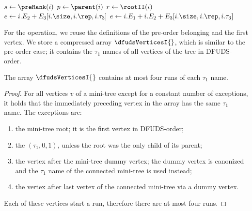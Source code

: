 \begin{algorithm}
\begin{algorithmic}
		\State {}
		\State {}
	\Else
		\State $s \gets \preRank(i)$
			\State $p \gets \parent(i)$
				\State $r \gets \rootII(i)$
				 
					\State $e \gets i.E_2 + E_3[i.\size, i.\rep, i.\tau_3]$
					\State {}
				\Else {}
					\State $e \gets i.E_1 + i.E_2 + E_3[i.\size, i.\rep, i.\tau_3]$
					\State {}
				\EndIf
			 
				\State {}
			\Else {}
				\State {}
			\EndIf
		 
			\State {}
		\Else {}
			\State {}
		\EndIf
	\EndIf
\EndFunction
\end{algorithmic}
\end{algorithm}

For the \dfudsSelect{} operation, we reuse the definitions of the pre-order belonging and the first vertex.
We store a compressed array $\dfudsVerticesI{}$, which is similar to the pre-order case; it contains the $\tau_1$ names of all vertices of the tree in DFUDS-order.
\begin{lemma}
	The array $\dfudsVerticesI{}$ contains at most four runs of each $\tau_1$ name.
\end{lemma}
\begin{proof}
	For all vertices $v$ of a mini-tree except for a constant number of exceptions, it holds that the immediately preceding vertex in the array has the same $\tau_1$ name.
	The exceptions are:
	\begin{enumerate}
		\item the mini-tree root; it is the first vertex in DFUDS-order;
		\item the $(\tau_1, 0, 1)$, unless the root was the only child of its parent;
		\item the vertex after the mini-tree dummy vertex; the dummy vertex is canonized and the $\tau_1$ name of the connected mini-tree is used instead;
		\item the vertex after last vertex of the connected mini-tree via a dummy vertex.
	\end{enumerate}
	Each of these vertices start a run, therefore there are at most four runs.
\end{proof}

